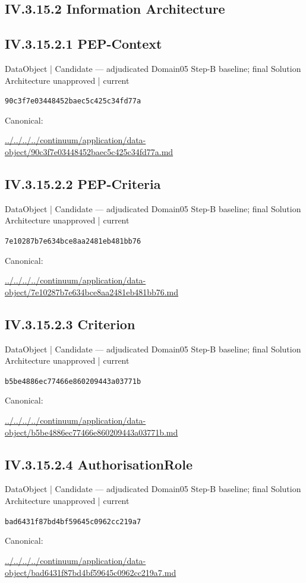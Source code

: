 \documentclass[10pt,a4paper]{article}
\begin{document}
\subsection*{IV.3.15.2 Information Architecture}
\subsection*{IV.3.15.2.1 PEP-Context}
\label{element-90c3f7e03448452baec5c425c34fd77a}
{\small DataObject | Candidate — adjudicated Domain05 Step-B baseline; final Solution Architecture unapproved | current}\par
\texttt{90c3f7e03448452baec5c425c34fd77a}\par
Canonical: \par
{\footnotesize\url{../../../../continuum/application/data-object/90c3f7e03448452baec5c425c34fd77a.md}}\par
\subsection*{IV.3.15.2.2 PEP-Criteria}
\label{element-7e10287b7e634bce8aa2481eb481bb76}
{\small DataObject | Candidate — adjudicated Domain05 Step-B baseline; final Solution Architecture unapproved | current}\par
\texttt{7e10287b7e634bce8aa2481eb481bb76}\par
Canonical: \par
{\footnotesize\url{../../../../continuum/application/data-object/7e10287b7e634bce8aa2481eb481bb76.md}}\par
\subsection*{IV.3.15.2.3 Criterion}
\label{element-b5be4886ec77466e860209443a03771b}
{\small DataObject | Candidate — adjudicated Domain05 Step-B baseline; final Solution Architecture unapproved | current}\par
\texttt{b5be4886ec77466e860209443a03771b}\par
Canonical: \par
{\footnotesize\url{../../../../continuum/application/data-object/b5be4886ec77466e860209443a03771b.md}}\par
\subsection*{IV.3.15.2.4 AuthorisationRole}
\label{element-bad6431f87bd4bf59645c0962cc219a7}
{\small DataObject | Candidate — adjudicated Domain05 Step-B baseline; final Solution Architecture unapproved | current}\par
\texttt{bad6431f87bd4bf59645c0962cc219a7}\par
Canonical: \par
{\footnotesize\url{../../../../continuum/application/data-object/bad6431f87bd4bf59645c0962cc219a7.md}}\par
\end{document}
